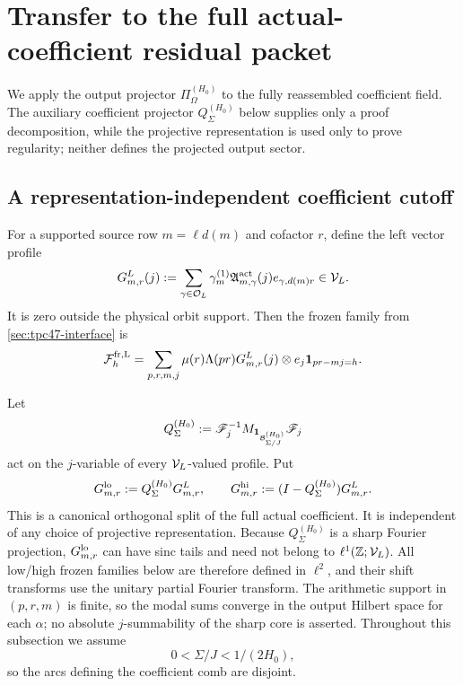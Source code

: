 \section{Transfer to the full actual-coefficient residual packet}
\label{sec:tpc47-actual-reassembly}

We apply the output projector \(\Pi_\Omega^{(H_0)}\) to the fully
reassembled coefficient field.  The auxiliary coefficient projector
\(Q_\Sigma^{(H_0)}\) below supplies only a proof decomposition, while
the projective representation is used only to prove regularity; neither
defines the projected output sector.

\subsection{A representation-independent coefficient cutoff}

For a supported source row \(m=\ell d(m)\) and cofactor \(r\), define
the left vector profile
\begin{equation}
 G_{m,r}^{L}(j)
 :=\sum_{\gamma\in\mathcal O_L}
 \gamma_m^{(1)}
 \mathfrak A_{m,\gamma}^{\rm act}(j)
 e_{\gamma,d(m)r}
 \in\mathcal V_L.
 \label{eq:tpc47-full-vector-profile}
\end{equation}
It is zero outside the physical orbit support.  Then the frozen family
from \cref{sec:tpc47-interface} is
\begin{equation}
 \mathcal F_h^{\rm fr,L}
 =\sum_{p,r,m,j}
 \mu(r)\Lambda(pr)G_{m,r}^{L}(j)\otimes e_j
 \mathbf 1_{pr-mj=h}.
 \label{eq:tpc47-full-packet-vector-profile}
\end{equation}

Let
\begin{equation}
 Q_\Sigma^{(H_0)}
 :=\mathscr F_j^{-1}
 M_{\mathbf 1_{\mathcal B_{\Sigma/J}^{(H_0)}}}\mathscr F_j
 \label{eq:tpc47-coefficient-lowpass}
\end{equation}
act on the \(j\)-variable of every \(\mathcal V_L\)-valued profile.  Put
\begin{equation}
 G_{m,r}^{\rm lo}:=Q_\Sigma^{(H_0)}G_{m,r}^{L},
 \qquad
 G_{m,r}^{\rm hi}:=(I-Q_\Sigma^{(H_0)})G_{m,r}^{L}.
 \label{eq:tpc47-full-profile-split}
\end{equation}
This is a canonical orthogonal split of the full actual coefficient.
It is independent of any choice of projective representation.
Because \(Q_\Sigma^{(H_0)}\) is a sharp Fourier projection,
\(G_{m,r}^{\rm lo}\) can have sinc tails and need not belong to
\(\ell^1(\mathbb Z;\mathcal V_L)\).  All low/high frozen families below are therefore
defined in \(\ell^2\), and their shift transforms use the unitary
partial Fourier transform.  The arithmetic support in \((p,r,m)\) is
finite, so the modal sums converge in the output Hilbert space for each
\(\alpha\); no absolute \(j\)-summability of the sharp core is asserted.
Throughout this subsection we assume
\begin{equation}
 0<\Sigma/J<1/(2H_0),
 \label{eq:tpc47-coefficient-band-disjoint}
\end{equation}
so the arcs defining the coefficient comb are disjoint.

